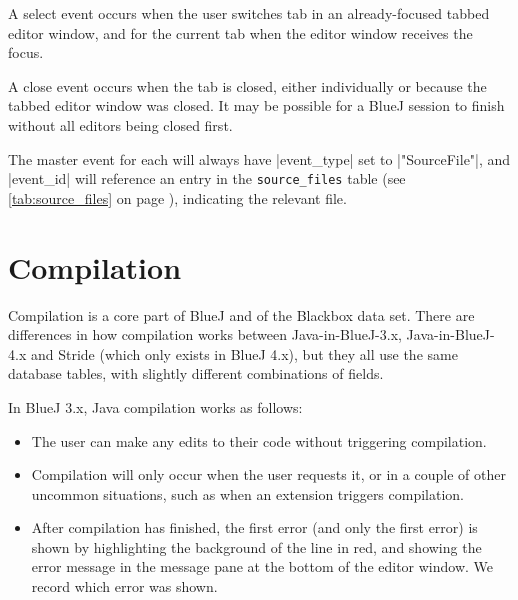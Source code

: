 \documentclass{report}
\newcommand{\myref}[1]{\autoref{#1} on page \pageref*{#1}}
\newcommand{\tabref}[1]{\lstinline|#1| table (see \myref{tab:#1})}
\begin{document}
A select event occurs when the user switches tab in an already-focused tabbed editor window,
and for the current tab when the editor window receives the focus.

A close event occurs when the tab is closed, either individually or because the tabbed editor
window was closed.  It may be possible for a BlueJ session to finish without all editors being
closed first.

The master event for each will always have |event_type| set to |"SourceFile"|, and
|event_id| will reference an entry in the \tabref{source_files},
indicating the relevant file.

\section{Compilation}

Compilation is a core part of BlueJ and of the Blackbox data set.  There are differences in how
compilation works between Java-in-BlueJ-3.x, Java-in-BlueJ-4.x and Stride (which only exists in BlueJ 4.x),
but they all use the same database tables, with slightly different combinations of fields.

In BlueJ 3.x, Java compilation works as follows:

\begin{itemize}
\item The user can make any edits to their code without triggering compilation.
\item Compilation will only occur when the user requests it, or in a couple of other
uncommon situations, such as when an extension triggers compilation.
\item After compilation has finished, the first error (and only the first error) is
shown by highlighting the background of the line in red, and showing the error message
in the message pane at the bottom of the editor window.  We record which error was shown.
\end{itemize}
\end{document}
